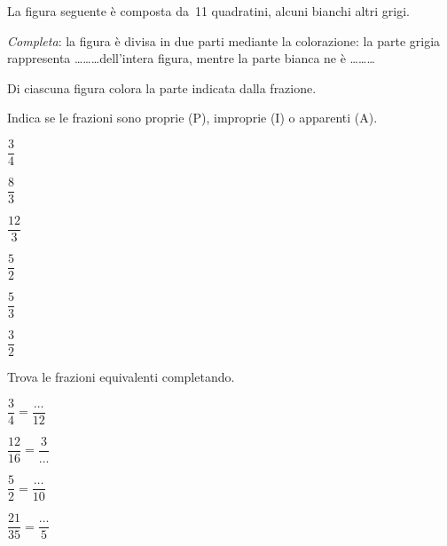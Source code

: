 \begin{esercizio}
 \label{ese:3.3}
La figura seguente è composta da~11 quadratini, alcuni bianchi altri grigi.
\begin{center}
 
\end{center}
\emph{Completa}: la figura è divisa in due parti mediante la colorazione: 
la parte grigia
rappresenta \ldots\ldots\ldots dell'intera figura, mentre la parte bianca 
ne è \ldots\ldots\ldots
\end{esercizio}

\begin{esercizio}
 \label{ese:3.4}
 Di ciascuna figura colora la parte indicata dalla frazione.
\begin{center}
 
\end{center}
\end{esercizio}

\begin{esercizio}
\label{ese:3.5}
 Indica se le frazioni sono proprie (P), improprie (I) o apparenti (A).
 \begin{multicols}{3}
 \TabPositions{0.6cm}
 \begin{enumeratea}
 \item $\dfrac{3}{4}$ \tab\quad\boxP\quad\boxI\quad\boxA\vspace{1.1ex}
 \item $\dfrac{8}{3}$ \tab\quad\boxP\quad\boxI\quad\boxA
 \item $\dfrac{12}{3}$ \tab\quad\boxP\quad\boxI\quad\boxA\vspace{1.1ex}
 \item $\dfrac{5}{2}$ \tab\quad\boxP\quad\boxI\quad\boxA
 \item $\dfrac{5}{3}$ \tab\quad\boxP\quad\boxI\quad\boxA\vspace{1.1ex}
 \item $\dfrac{3}{2}$ \tab\quad\boxP\quad\boxI\quad\boxA
 \end{enumeratea}
 \end{multicols}
\end{esercizio}

\begin{esercizio}
\label{ese:3.6}
Trova le frazioni equivalenti completando.
 \begin{multicols}{4}
 \begin{enumeratea}
 	\item $\dfrac{3}{4}=\dfrac{\ldots}{12}$
 	\item $\dfrac{12}{16}=\dfrac{3}{\ldots}$
 	\item $\dfrac{5}{2}=\dfrac{\ldots}{10}$
 	\item $\dfrac{21}{35}=\dfrac{\ldots}{5}$
 \end{enumeratea}
 \end{multicols}
\end{esercizio}

